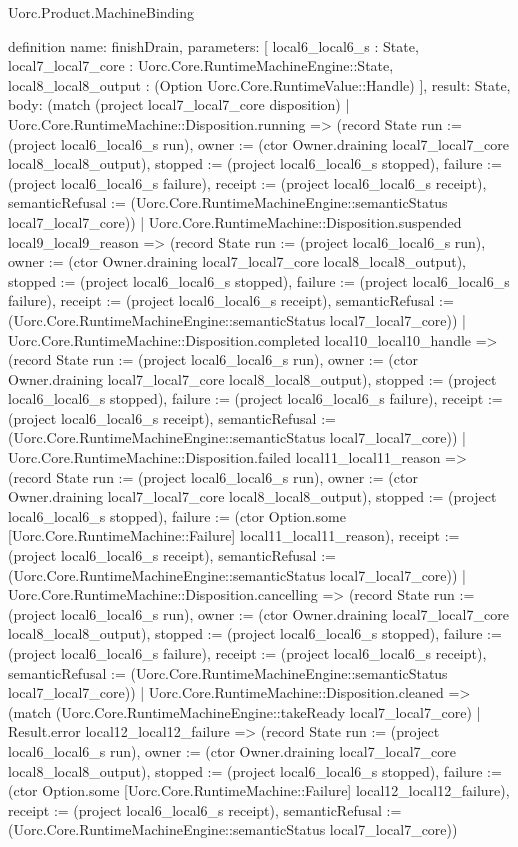 \begin{lexlean}{Uorc.Product.MachineBinding}
\begin{semanticmodule}
definition{
  name: finishDrain,
  parameters: [
    local6_local6_s : State,
    local7_local7_core : Uorc.Core.RuntimeMachineEngine::State,
    local8_local8_output : (Option Uorc.Core.RuntimeValue::Handle)
  ],
  result: State,
  body: (match (project local7_local7_core disposition)
    | Uorc.Core.RuntimeMachine::Disposition.running => (record State {run := (project local6_local6_s run), owner := (ctor Owner.draining local7_local7_core local8_local8_output), stopped := (project local6_local6_s stopped), failure := (project local6_local6_s failure), receipt := (project local6_local6_s receipt), semanticRefusal := (Uorc.Core.RuntimeMachineEngine::semanticStatus local7_local7_core)})
    | Uorc.Core.RuntimeMachine::Disposition.suspended local9_local9_reason => (record State {run := (project local6_local6_s run), owner := (ctor Owner.draining local7_local7_core local8_local8_output), stopped := (project local6_local6_s stopped), failure := (project local6_local6_s failure), receipt := (project local6_local6_s receipt), semanticRefusal := (Uorc.Core.RuntimeMachineEngine::semanticStatus local7_local7_core)})
    | Uorc.Core.RuntimeMachine::Disposition.completed local10_local10_handle => (record State {run := (project local6_local6_s run), owner := (ctor Owner.draining local7_local7_core local8_local8_output), stopped := (project local6_local6_s stopped), failure := (project local6_local6_s failure), receipt := (project local6_local6_s receipt), semanticRefusal := (Uorc.Core.RuntimeMachineEngine::semanticStatus local7_local7_core)})
    | Uorc.Core.RuntimeMachine::Disposition.failed local11_local11_reason => (record State {run := (project local6_local6_s run), owner := (ctor Owner.draining local7_local7_core local8_local8_output), stopped := (project local6_local6_s stopped), failure := (ctor Option.some [Uorc.Core.RuntimeMachine::Failure] local11_local11_reason), receipt := (project local6_local6_s receipt), semanticRefusal := (Uorc.Core.RuntimeMachineEngine::semanticStatus local7_local7_core)})
    | Uorc.Core.RuntimeMachine::Disposition.cancelling => (record State {run := (project local6_local6_s run), owner := (ctor Owner.draining local7_local7_core local8_local8_output), stopped := (project local6_local6_s stopped), failure := (project local6_local6_s failure), receipt := (project local6_local6_s receipt), semanticRefusal := (Uorc.Core.RuntimeMachineEngine::semanticStatus local7_local7_core)})
    | Uorc.Core.RuntimeMachine::Disposition.cleaned => (match (Uorc.Core.RuntimeMachineEngine::takeReady local7_local7_core)
      | Result.error local12_local12_failure => (record State {run := (project local6_local6_s run), owner := (ctor Owner.draining local7_local7_core local8_local8_output), stopped := (project local6_local6_s stopped), failure := (ctor Option.some [Uorc.Core.RuntimeMachine::Failure] local12_local12_failure), receipt := (project local6_local6_s receipt), semanticRefusal := (Uorc.Core.RuntimeMachineEngine::semanticStatus local7_local7_core)})
}
\end{semanticmodule}
\end{lexlean}
